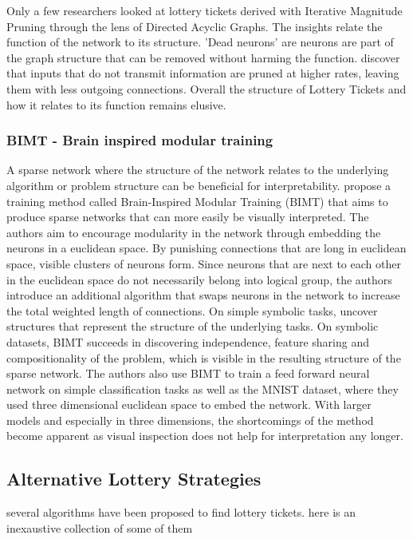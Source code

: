 Only a few researchers looked at lottery tickets derived with Iterative Magnitude Pruning through the lens of Directed Acyclic Graphs. 
The insights relate the function of the network to its structure.
'Dead neurons' \autocite{HanEtAl15, AllAlivePruning} are neurons are part of the graph structure that can be removed without harming the function. 
\textcite{DBLP:conf/iclr/FrankleC19} discover that inputs that do not transmit information are pruned at higher rates, leaving them with less outgoing connections.
Overall the structure of Lottery Tickets and how it relates to its function remains elusive.

\subsubsection{BIMT - Brain inspired modular training}
A sparse network where the structure of the network relates to the underlying algorithm or problem structure can be beneficial for interpretability.
\textcite{BIMT} propose a training method called Brain-Inspired Modular Training (BIMT) that aims to produce sparse networks that can more easily be visually interpreted.
The authors aim to encourage modularity in the network through embedding the neurons in a euclidean space.
By punishing connections that are long in euclidean space, visible clusters of neurons form. 
Since neurons that are next to each other in the euclidean space do not necessarily belong into logical group, the authors introduce an additional algorithm that swaps neurons in the network to increase the total weighted length of connections.
On simple symbolic tasks, \autocite{BIMT} uncover structures that represent the structure of the underlying tasks.
On symbolic datasets, BIMT succeeds in discovering independence, feature sharing and compositionality of the problem, which is visible in the resulting structure of the sparse network.
The authors also use BIMT to train a feed forward neural network on simple classification tasks as well as the MNIST dataset, where they used three dimensional euclidean space to embed the network.
With larger models and especially in three dimensions, the shortcomings of the method become apparent as visual inspection does not help for interpretation any longer.

\subsection{Alternative Lottery Strategies}
several algorithms have been proposed to find lottery tickets. here is an inexaustive collection of some of them 

